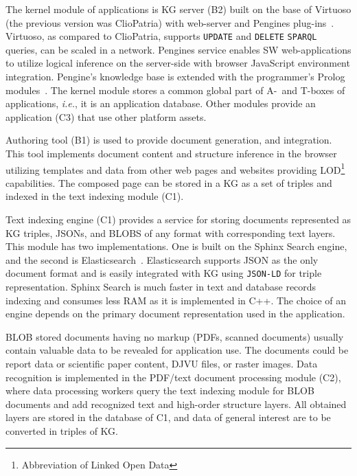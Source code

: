 \documentclass[
]{aiitart}
\begin{document}
The kernel module of applications is KG server (B2) built on the base of Virtuoso (the previous version was ClioPatria) with web-server and Pengines plug-ins~\cite{pengines}.  %
Virtuoso, as compared to ClioPatria, supports \verb|UPDATE| and \verb|DELETE| \verb|SPARQL| queries, can be scaled in a network.  Pengines service enables SW web-applications to utilize logical inference on the server-side with browser JavaScript environment integration.  Pengine's knowledge base is extended with the programmer's Prolog modules~\cite{b10,swi}.  The kernel module stores a common global part of A-~and T-boxes of applications, \emph{i.e.}, it is an application database.  Other modules provide an application (C3) that use other platform assets.

Authoring tool (B1) \cite{authoring,zont19} is used to provide document generation, and integration.  This tool implements document content and structure inference in the browser utilizing templates and data from other web pages and websites providing LOD\footnote{Abbreviation of Linked Open Data} \cite{b1,c6} capabilities. The composed page can be stored in a KG as a set of triples and indexed in the text indexing module (C1).

Text indexing engine (C1)  provides a service for storing documents represented as KG triples, JSONs, and BLOBS of any format with corresponding text layers.  This module has two implementations.  One is built on the Sphinx Search engine, and the second is Elasticsearch~\cite{b13}.  Elasticsearch supports JSON as the only document format and is easily integrated with KG using \verb|JSON-LD| for triple representation.  Sphinx Search is much faster in text and database records indexing and consumes less RAM as it is implemented in C++.  The choice of an engine depends on the primary document representation used in the application.

BLOB stored documents having no markup (PDFs, scanned documents) usually contain valuable data to be revealed for application use.  The documents could be report data or scientific paper content, DJVU files, or raster images.  Data recognition is implemented in the PDF/text document processing module (C2), where data processing workers query the text indexing module for BLOB documents and add recognized text and high-order structure layers.  All obtained layers are stored in the database of C1, and data of general interest are to be converted in triples of KG.
\end{document}
